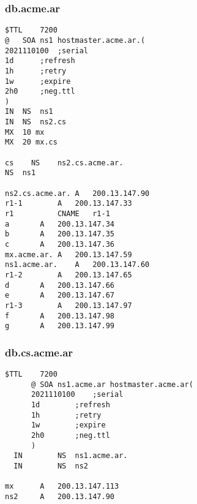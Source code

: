 \documentclass[11pt]{article}
\begin{document}
\subsubsection*{db.acme.ar}
\label{sec:org88c47fe}
\begin{verbatim}
$TTL	7200
@	SOA	ns1	hostmaster.acme.ar.(
2021110100	;serial
1d		;refresh
1h		;retry
1w		;expire
2h0		;neg.ttl
)
IN	NS	ns1
IN	NS	ns2.cs
MX	10 mx
MX	20 mx.cs

cs    NS	ns2.cs.acme.ar.
NS	ns1

ns2.cs.acme.ar.	A	200.13.147.90
r1-1		A	200.13.147.33
r1			CNAME	r1-1
a		A	200.13.147.34
b		A	200.13.147.35
c		A	200.13.147.36
mx.acme.ar.	A	200.13.147.59
ns1.acme.ar.	A	200.13.147.60
r1-2		A	200.13.147.65
d		A	200.13.147.66
e		A	200.13.147.67
r1-3		A	200.13.147.97
f		A	200.13.147.98
g		A	200.13.147.99
\end{verbatim}
\subsubsection*{db.cs.acme.ar}
\label{sec:org53025d3}
\begin{verbatim}
$TTL	7200
      @	SOA	ns1.acme.ar	hostmaster.acme.ar(
      2021110100	;serial
      1d		;refresh
      1h		;retry
      1w		;expire
      2h0		;neg.ttl
      )
  IN		NS	ns1.acme.ar.
  IN		NS	ns2

mx		A	200.13.147.113
ns2		A	200.13.147.90
\end{verbatim}
\end{document}
